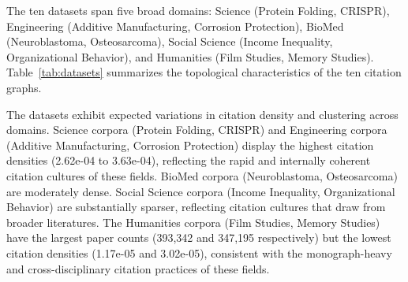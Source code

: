 \documentclass[11pt,a4paper]{article}
\begin{document}
The ten datasets span five broad domains: Science (Protein Folding, CRISPR), Engineering (Additive Manufacturing, Corrosion Protection), BioMed (Neuroblastoma, Osteosarcoma), Social Science (Income Inequality, Organizational Behavior), and Humanities (Film Studies, Memory Studies). Table~\ref{tab:datasets} summarizes the topological characteristics of the ten citation graphs.

\begin{table}[H]
\centering
\caption{Descriptive statistics of the ten topical citation graphs extracted from Dimensions (1975--2024).}
\label{tab:datasets}
\end{table}

The datasets exhibit expected variations in citation density and clustering across domains. Science corpora (Protein Folding, CRISPR) and Engineering corpora (Additive Manufacturing, Corrosion Protection) display the highest citation densities (2.62e-04 to 3.63e-04), reflecting the rapid and internally coherent citation cultures of these fields. BioMed corpora (Neuroblastoma, Osteosarcoma) are moderately dense. Social Science corpora (Income Inequality, Organizational Behavior) are substantially sparser, reflecting citation cultures that draw from broader literatures. The Humanities corpora (Film Studies, Memory Studies) have the largest paper counts (393,342 and 347,195 respectively) but the lowest citation densities (1.17e-05 and 3.02e-05), consistent with the monograph-heavy and cross-disciplinary citation practices of these fields.
\end{document}
